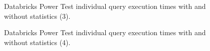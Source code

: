 \begin{figure}
   \begin{center}
   \end{center}
   \caption{Databricks Power Test individual query execution times with and without statistics (3).}
   \label{fig:additionalResultsDatabricksWithStatsPowerTestIndividualQueries3}
\end{figure}

\begin{figure}
   \begin{center}
   \end{center}
   \caption{Databricks Power Test individual query execution times with and without statistics (4).}
   \label{fig:additionalResultsDatabricksWithStatsPowerTestIndividualQueries4}
\end{figure}

